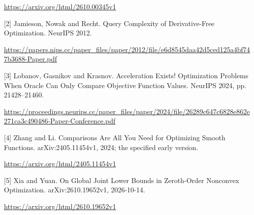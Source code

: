 \documentclass[10pt,a4paper]{article}
\begin{document}
\url{https://arxiv.org/html/2610.00345v1}

[2] Jamieson, Nowak and Recht. Query Complexity of Derivative-Free Optimization. NeurIPS 2012.

\url{https://papers.nips.cc/paper_files/paper/2012/file/e6d8545daa42d5ced125a4bf747b3688-Paper.pdf}

[3] Lobanov, Gasnikov and Krasnov. Acceleration Exists! Optimization Problems When Oracle Can Only Compare Objective Function Values. NeurIPS 2024, pp. 21428--21460.

\url{https://proceedings.neurips.cc/paper_files/paper/2024/file/26289c647c6828e862e271ca3c490486-Paper-Conference.pdf}

[4] Zhang and Li. Comparisons Are All You Need for Optimizing Smooth Functions. arXiv:2405.11454v1, 2024; the specified early version.

\url{https://arxiv.org/html/2405.11454v1}

[5] Xia and Yuan. On Global Joint Lower Bounds in Zeroth-Order Nonconvex Optimization. arXiv:2610.19652v1, 2026-10-14.

\url{https://arxiv.org/html/2610.19652v1}
\end{document}
